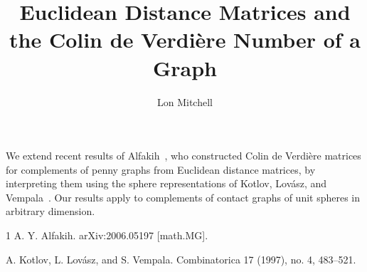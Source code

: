 \documentclass[a4paper]{amsart}
\date{}
\begin{document}
\title{Euclidean Distance Matrices and the Colin de Verdi\`ere Number of a  Graph}
\author{Lon Mitchell} %
\address{University of South Florida} %

\maketitle


We extend recent results of Alfakih~\cite{A}, who constructed Colin de Verdi\`ere matrices for complements of penny graphs from Euclidean distance matrices, by interpreting them using the sphere representations of Kotlov, Lov\'{a}sz, and Vempala~\cite{B}.   Our results apply to complements of contact graphs of unit spheres in arbitrary dimension. 

\begin{thebibliography}{1}
A. Y. Alfakih.
\newblock 	arXiv:2006.05197 [math.MG].

A. Kotlov, L. Lov\'asz, and S. Vempala.
\newblock  Combinatorica 17 (1997), no. 4, 483–521.
\end{thebibliography}
\end{document}
